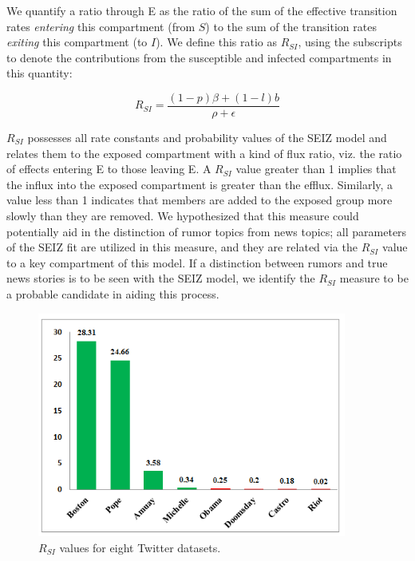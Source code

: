 We quantify a ratio through E as the ratio of the sum of the effective transition rates \textit{entering} this compartment (from $S$) to the sum of the transition rates \textit{exiting} this compartment (to $I$). We define this ratio as $R_{SI}$, using the subscripts to denote the contributions from the susceptible and infected compartments in this quantity:

\begin{equation}
\label{eq:R_es}
R_{SI}=\frac{(1-p)\beta +(1-l)b}{\rho + \epsilon}
\end{equation}

$R_{SI}$ possesses all rate constants and probability values of the SEIZ model and relates them to the exposed compartment with a kind of flux ratio, viz.
the ratio of effects entering E to those leaving E. A $R_{SI}$ value greater than 1 implies that the influx into the exposed compartment is greater than the efflux. Similarly, a value less than 1 indicates that members are added to the exposed group more slowly than they are removed. We hypothesized that this measure could potentially aid in the distinction of rumor topics from news topics; all parameters of the SEIZ fit are utilized in this measure, and they are related via the $R_{SI}$ value to a key compartment of this model. If a distinction between rumors and true news stories is to be seen with the SEIZ model, we identify the $R_{SI}$ measure to be a probable candidate in aiding this process.

\begin{figure}[t]
\centering
  \includegraphics[width=4in]{pictures/reproductive-ratio.png}
   \caption{$R_{SI}$ values for eight Twitter datasets.}
  \label{fig:ratio}
\end{figure}


